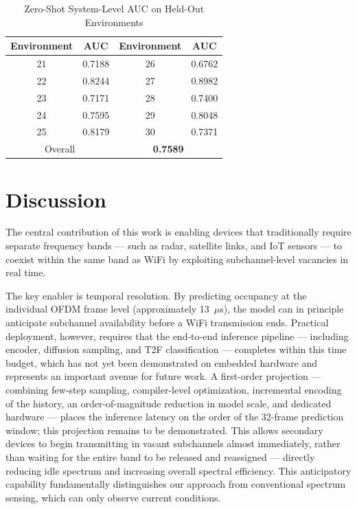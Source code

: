 \documentclass[lettersize,journal]{IEEEtran}
\begin{document}
\begin{table}[!t]
\centering
\caption{Zero-Shot System-Level AUC on Held-Out Environments
\label{tab:zeroshot}}
\begin{tabular}{cc|cc}
\hline
Environment & AUC & Environment & AUC \\
\hline
21 & 0.7188 & 26 & 0.6762 \\
22 & 0.8244 & 27 & 0.8982 \\
23 & 0.7171 & 28 & 0.7400 \\
24 & 0.7595 & 29 & 0.8048 \\
25 & 0.8179 & 30 & 0.7371 \\
\hline
\multicolumn{2}{c|}{Overall} & \multicolumn{2}{c}{\textbf{0.7589}} \\
\hline
\end{tabular}
\end{table}

\section{Discussion}
The central contribution of this work is enabling devices that traditionally require separate frequency bands — such as radar, satellite links, and IoT sensors — to coexist within the same band as WiFi by exploiting subchannel-level vacancies in real time.

The key enabler is temporal resolution. By predicting occupancy at the individual OFDM frame level (approximately 13~$\mu$s), the model can in principle anticipate subchannel availability before a WiFi transmission ends. Practical deployment, however, requires that the end-to-end inference pipeline — including encoder, diffusion sampling, and T2F classification — completes within this time budget, which has not yet been demonstrated on embedded hardware and represents an important avenue for future work. A first-order projection — combining few-step sampling, compiler-level optimization, incremental encoding of the history, an order-of-magnitude reduction in model scale, and dedicated hardware — places the inference latency on the order of the 32-frame prediction window; this projection remains to be demonstrated. This allows secondary devices to begin transmitting in vacant subchannels almost immediately, rather than waiting for the entire band to be released and reassigned — directly reducing idle spectrum and increasing overall spectral efficiency. This anticipatory capability fundamentally distinguishes our approach from conventional spectrum sensing, which can only observe current conditions.
\end{document}
